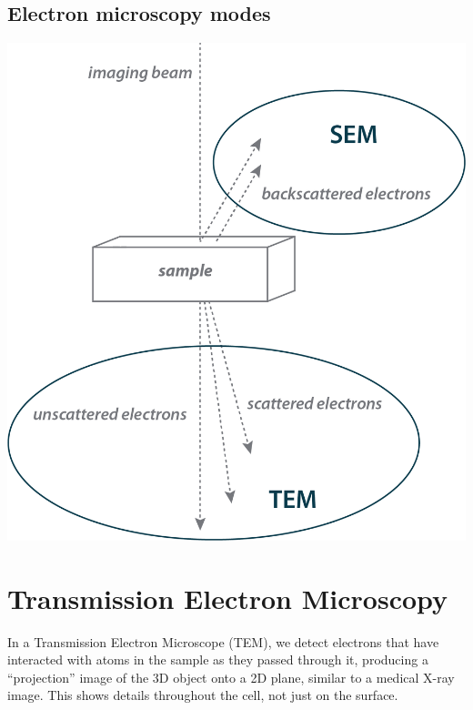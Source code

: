 \documentclass[]{tufte-book}
\begin{document}
\subsection{Electron microscopy modes}\label{Electron_microscopy_modes}

\includegraphics{img/schematics/1_3_1}

\section{Transmission Electron
Microscopy}\label{transmission-electron-microscopy}

In a Transmission Electron Microscope (TEM), we detect electrons that
have interacted with atoms in the sample as they passed through it,
producing a ``projection'' image of the 3D object onto a 2D plane,
similar to a medical X-ray image. This shows details throughout the
cell, not just on the surface.
\end{document}
